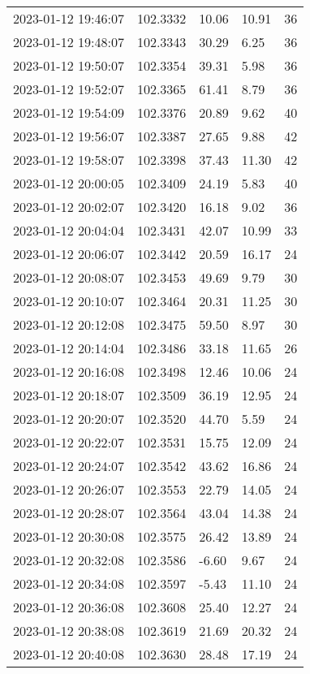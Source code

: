 \documentclass{nature_plusfigure}
\begin{document}
\begin{supplement}
\begin{center}
\begin{longtable}{lllll}
2023-01-12 19:46:07 & 102.3332 & 10.06 & 10.91 & 36 \\ 
2023-01-12 19:48:07 & 102.3343 & 30.29 & 6.25 & 36 \\ 
2023-01-12 19:50:07 & 102.3354 & 39.31 & 5.98 & 36 \\ 
2023-01-12 19:52:07 & 102.3365 & 61.41 & 8.79 & 36 \\ 
2023-01-12 19:54:09 & 102.3376 & 20.89 & 9.62 & 40 \\ 
2023-01-12 19:56:07 & 102.3387 & 27.65 & 9.88 & 42 \\ 
2023-01-12 19:58:07 & 102.3398 & 37.43 & 11.30 & 42 \\ 
2023-01-12 20:00:05 & 102.3409 & 24.19 & 5.83 & 40 \\ 
2023-01-12 20:02:07 & 102.3420 & 16.18 & 9.02 & 36 \\ 
2023-01-12 20:04:04 & 102.3431 & 42.07 & 10.99 & 33 \\ 
2023-01-12 20:06:07 & 102.3442 & 20.59 & 16.17 & 24 \\ 
2023-01-12 20:08:07 & 102.3453 & 49.69 & 9.79 & 30 \\ 
2023-01-12 20:10:07 & 102.3464 & 20.31 & 11.25 & 30 \\ 
2023-01-12 20:12:08 & 102.3475 & 59.50 & 8.97 & 30 \\ 
2023-01-12 20:14:04 & 102.3486 & 33.18 & 11.65 & 26 \\ 
2023-01-12 20:16:08 & 102.3498 & 12.46 & 10.06 & 24 \\ 
2023-01-12 20:18:07 & 102.3509 & 36.19 & 12.95 & 24 \\ 
2023-01-12 20:20:07 & 102.3520 & 44.70 & 5.59 & 24 \\ 
2023-01-12 20:22:07 & 102.3531 & 15.75 & 12.09 & 24 \\ 
2023-01-12 20:24:07 & 102.3542 & 43.62 & 16.86 & 24 \\ 
2023-01-12 20:26:07 & 102.3553 & 22.79 & 14.05 & 24 \\ 
2023-01-12 20:28:07 & 102.3564 & 43.04 & 14.38 & 24 \\ 
2023-01-12 20:30:08 & 102.3575 & 26.42 & 13.89 & 24 \\ 
2023-01-12 20:32:08 & 102.3586 & -6.60 & 9.67 & 24 \\ 
2023-01-12 20:34:08 & 102.3597 & -5.43 & 11.10 & 24 \\ 
2023-01-12 20:36:08 & 102.3608 & 25.40 & 12.27 & 24 \\ 
2023-01-12 20:38:08 & 102.3619 & 21.69 & 20.32 & 24 \\ 
2023-01-12 20:40:08 & 102.3630 & 28.48 & 17.19 & 24 \\ 

\end{longtable}
\end{center}
\end{supplement}
\end{document}
